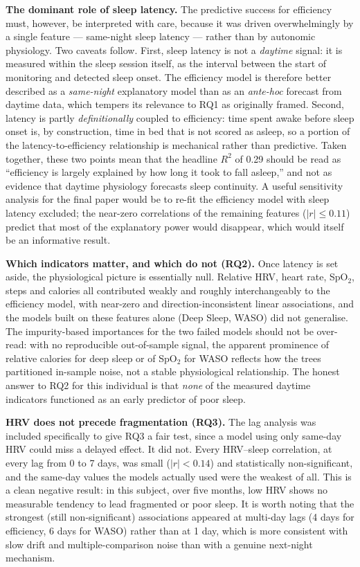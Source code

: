 \documentclass[fleqn,10pt]{wlscirep}
\begin{document}
\noindent\textbf{The dominant role of sleep latency.} The predictive success for efficiency must, however, be interpreted with care, because it was driven overwhelmingly by a single feature --- same-night sleep latency --- rather than by autonomic physiology. Two caveats follow. First, sleep latency is not a \emph{daytime} signal: it is measured within the sleep session itself, as the interval between the start of monitoring and detected sleep onset. The efficiency model is therefore better described as a \emph{same-night} explanatory model than as an \emph{ante-hoc} forecast from daytime data, which tempers its relevance to RQ1 as originally framed. Second, latency is partly \emph{definitionally} coupled to efficiency: time spent awake before sleep onset is, by construction, time in bed that is not scored as asleep, so a portion of the latency-to-efficiency relationship is mechanical rather than predictive. Taken together, these two points mean that the headline $R^2$ of 0.29 should be read as ``efficiency is largely explained by how long it took to fall asleep,'' and not as evidence that daytime physiology forecasts sleep continuity. A useful sensitivity analysis for the final paper would be to re-fit the efficiency model with sleep latency excluded; the near-zero correlations of the remaining features ($|r| \leq 0.11$) predict that most of the explanatory power would disappear, which would itself be an informative result.

\noindent\textbf{Which indicators matter, and which do not (RQ2).} Once latency is set aside, the physiological picture is essentially null. Relative HRV, heart rate, SpO$_2$, steps and calories all contributed weakly and roughly interchangeably to the efficiency model, with near-zero and direction-inconsistent linear associations, and the models built on these features alone (Deep Sleep, WASO) did not generalise. The impurity-based importances for the two failed models should not be over-read: with no reproducible out-of-sample signal, the apparent prominence of relative calories for deep sleep or of SpO$_2$ for WASO reflects how the trees partitioned in-sample noise, not a stable physiological relationship. The honest answer to RQ2 for this individual is that \emph{none} of the measured daytime indicators functioned as an early predictor of poor sleep.

\noindent\textbf{HRV does not precede fragmentation (RQ3).} The lag analysis was included specifically to give RQ3 a fair test, since a model using only same-day HRV could miss a delayed effect. It did not. Every HRV--sleep correlation, at every lag from 0 to 7 days, was small ($|r| < 0.14$) and statistically non-significant, and the same-day values the models actually used were the weakest of all. This is a clean negative result: in this subject, over five months, low HRV shows no measurable tendency to lead fragmented or poor sleep. It is worth noting that the strongest (still non-significant) associations appeared at multi-day lags (4 days for efficiency, 6 days for WASO) rather than at 1 day, which is more consistent with slow drift and multiple-comparison noise than with a genuine next-night mechanism.
\end{document}
